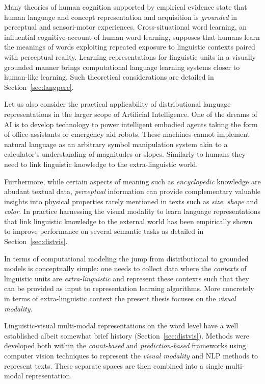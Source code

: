 Many theories of human cognition supported by empirical
evidence state that human language and concept representation and acquisition is \emph{grounded}
in perceptual and sensori-motor experiences. Cross-situational word learning,
an influential cognitive account of human word learning, supposes that humans learn the
meanings of words exploiting repeated exposure to linguistic contexts paired with perceptual reality.
Learning representations for linguistic units in a visually grounded manner brings
computational language learning systems closer to human-like learning.
Such theoretical considerations are detailed in Section~\ref{sec:langperc}.

Let us also consider the practical applicability of distributional language representations in the larger scope of Artificial
Intelligence. One of the dreams of AI is to develop technology to power intelligent embodied agents
taking the form of office assistants or emergency aid robots. These machines cannot implement natural
language as an arbitrary symbol manipulation system akin to a calculator's understanding of
magnitudes or slopes.
Similarly to humans they need to link linguistic knowledge to the extra-linguistic world.

Furthermore, while certain aspects of meaning  such as \emph{encyclopedic}
knowledge are abudant textual data, \emph{perceptual} information
can provide complementary valuable insights into physical properties rarely mentioned 
in texts such as \emph{size}, \emph{shape} and \emph{color}. 
In practice harnessing the visual modality to learn language
representations that link linguistic knowledge
to the external world  has been empirically shown to improve performance on several semantic tasks as
detailed in Section~\ref{sec:distvis}.


In terms of computational modeling the jump from
distributional to grounded models is conceptually simple: one needs to collect data where
the \emph{contexts} of linguistic units are \emph{extra-linguistic} and represent these contexts such
that they can be provided as input to representation learning algorithms.
More concretely in terms of extra-linguistic context the present thesis focuses on the \emph{visual modality}.

Linguistic-visual multi-modal representations on the word level have a well established albeit
somewhat brief history (Section~\ref{sec:distvis}).
Methods were developed both within the \emph{count-based}
and \emph{prediction-based} frameworks using computer vision techniques to represent the
\emph{visual modality} and NLP methods to represent texts.
These separate spaces are then combined into a single multi-modal representation.

